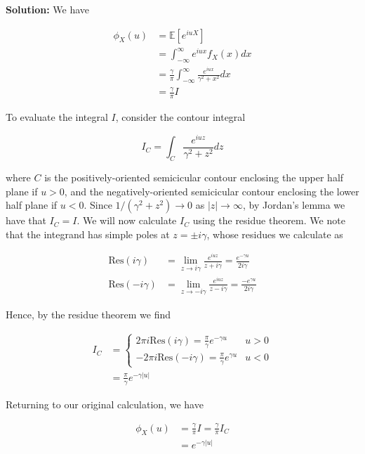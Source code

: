 \documentclass[12pt, a4paper]{article}
\begin{document}
\begin{enumerate}
\begin{enumerate}
            \textbf{Solution:} We have 

            \begin{align*}
                \phi_X(u) &= \mathbb E [e^{iuX}] \\
                &= \int_{-\infty}^\infty e^{iux} f_X(x)dx\\
                &= \frac{\gamma}{\pi} \int_{-\infty}^\infty \frac{e^{iux}}{\gamma^2 + x^2} dx \\
                &= \frac{\gamma}{\pi} I
            \end{align*}

            To evaluate the integral $I$, consider the contour integral 

            $$I_C = \int_C \frac{e^{iuz}}{\gamma^2 + z^2}dz$$

            where $C$ is the positively-oriented semicicular contour enclosing the upper half plane if $u>0$, and the negatively-oriented semicicular contour enclosing the lower half plane if $u<0$. Since $1/(\gamma^2 + z^2) \rightarrow 0$ as $|z| \rightarrow \infty$, by Jordan's lemma we have that $I_C = I$. We will now calculate $I_C$ using the residue theorem. We note that the integrand has simple poles at $z = \pm i\gamma$, whose residues we calculate as 

            \begin{align*}
                \text{Res}(i\gamma) &= \lim_{z \rightarrow i\gamma} \frac{e^{iuz}}{z+ i\gamma} = \frac{e^{-\gamma u}}{2i\gamma} \\
                \text{Res}(-i\gamma) &= \lim_{z \rightarrow -i\gamma} \frac{e^{iuz}}{z-i\gamma} = \frac{-e^{\gamma u}}{2i\gamma}
            \end{align*}

            Hence, by the residue theorem we find 

            \begin{align*}
                I_C &= \begin{cases} 2 \pi i \text{Res}(i\gamma) = \frac{\pi}{\gamma} e^{-\gamma u} & u>0 \\ -2 \pi i \text{Res}(-i\gamma) = \frac{\pi}{\gamma}e^{\gamma u} & u<0 \end{cases} \\
                &= \frac{\pi}{\gamma} e^{-\gamma |u|}
            \end{align*}

            Returning to our original calculation, we have

            \begin{align*}
                \phi_X(u) &= \frac{\gamma}{\pi} I = \frac{\gamma}{\pi} I_C \\
                &= e^{-\gamma |u|}
            \end{align*}


\end{enumerate}
\end{enumerate}
\end{document}
